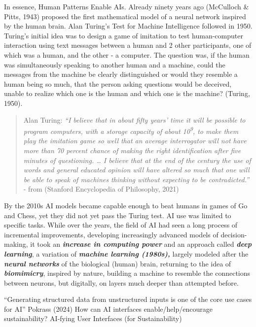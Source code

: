 \documentclass[
  letterpaper,
  DIV=11,
  numbers=noendperiod]{scrartcl}
\begin{document}
In essence, Human Patterns Enable AIs. Already ninety years ago
(McCulloch \& Pitts, 1943) proposed the first mathematical model of a
neural network inspired by the human brain. Alan Turing's Test for
Machine Intelligence followed in 1950. Turing's initial idea was to
design a game of imitation to test human-computer interaction using text
messages between a human and 2 other participants, one of which was a
human, and the other - a computer. The question was, if the human was
simultaneously speaking to another human and a machine, could the
messages from the machine be clearly distinguished or would they
resemble a human being so much, that the person asking questions would
be deceived, unable to realize which one is the human and which one is
the machine? (Turing, 1950).

\begin{quote}
Alan Turing: \emph{``I believe that in about fifty years' time it will
be possible to program computers, with a storage capacity of about
10\textsuperscript{9}, to make them play the imitation game so well that
an average interrogator will not have more than 70 percent chance of
making the right identification after five minutes of questioning.
\ldots{} I believe that at the end of the century the use of words and
general educated opinion will have altered so much that one will be able
to speak of machines thinking without expecting to be contradicted.''} -
from (Stanford Encyclopedia of Philosophy, 2021)
\end{quote}

By the 2010s AI models became capable enough to beat humans in games of
Go and Chess, yet they did not yet pass the Turing test. AI use was
limited to specific tasks. While over the years, the field of AI had
seen a long process of incremental improvements, developing increasingly
advanced models of decision-making, it took an \textbf{\emph{increase in
computing power}} and an approach called \textbf{\emph{deep learning}},
a variation of \textbf{\emph{machine learning (1980s),}} largely modeled
after the \textbf{\emph{neural networks}} of the biological (human)
brain, returning to the idea of \textbf{\emph{biomimicry}}, inspired by
nature, building a machine to resemble the connections between neurons,
but digitally, on layers much deeper than attempted before.

``Generating structured data from unstructured inputs is one of the core
use cases for AI'' Pokrass (2024) How can AI interfaces
enable/help/encourage sustainability? AI-fying User Interfaces (for
Sustainability)
\end{document}

